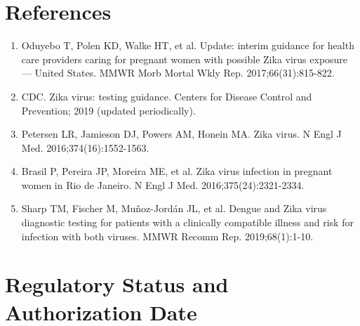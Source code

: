 \section*{References}
\begin{enumerate}
  \item Oduyebo T, Polen KD, Walke HT, et al. Update: interim guidance for health care providers caring for pregnant women with possible Zika virus exposure --- United States. MMWR Morb Mortal Wkly Rep. 2017;66(31):815-822.
  \item CDC. Zika virus: testing guidance. Centers for Disease Control and Prevention; 2019 (updated periodically).
  \item Petersen LR, Jamieson DJ, Powers AM, Honein MA. Zika virus. N Engl J Med. 2016;374(16):1552-1563.
  \item Brasil P, Pereira JP, Moreira ME, et al. Zika virus infection in pregnant women in Rio de Janeiro. N Engl J Med. 2016;375(24):2321-2334.
  \item Sharp TM, Fischer M, Muñoz-Jordán JL, et al. Dengue and Zika virus diagnostic testing for patients with a clinically compatible illness and risk for infection with both viruses. MMWR Recomm Rep. 2019;68(1):1-10.
\end{enumerate}

\clearpage
\section*{Regulatory Status and Authorization Date}

\clearpage
